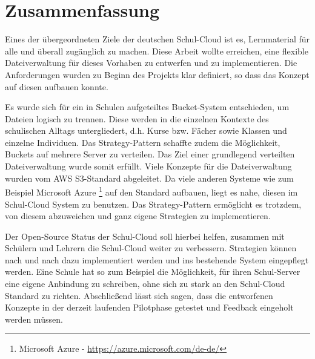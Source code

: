 \section{Zusammenfassung}
\label{sec:conclusion}

Eines der übergeordneten Ziele der deutschen Schul-Cloud ist es, Lernmaterial für alle und überall zugänglich zu machen. Diese Arbeit wollte erreichen, eine flexible Dateiverwaltung für dieses Vorhaben zu entwerfen und zu implementieren. Die Anforderungen wurden zu Beginn des Projekts klar definiert, so dass das Konzept auf diesen aufbauen konnte.

 Es wurde sich für ein in Schulen aufgeteiltes Bucket-System entschieden, um Dateien logisch zu trennen. Diese werden in die einzelnen Kontexte des schulischen Alltags untergliedert, d.h. Kurse bzw. Fächer sowie Klassen und einzelne Individuen. Das Strategy-Pattern schaffte zudem die Möglichkeit, Buckets auf mehrere Server zu verteilen. Das Ziel einer grundlegend verteilten Dateiverwaltung wurde somit erfüllt. Viele Konzepte für die Dateiverwaltung wurden vom AWS S3-Standard abgeleitet. Da viele anderen Systeme wie zum Beispiel Microsoft Azure \footnote{Microsoft Azure - \url{https://azure.microsoft.com/de-de/}} auf den Standard aufbauen, liegt es nahe, diesen im Schul-Cloud System zu benutzen. Das Strategy-Pattern ermöglicht es trotzdem, von diesem abzuweichen und ganz eigene Strategien zu implementieren.

Der Open-Source Status der Schul-Cloud soll hierbei helfen, zusammen mit Schülern und Lehrern die Schul-Cloud weiter zu verbessern. Strategien können nach und nach dazu implementiert werden und ins bestehende System eingepflegt werden. Eine Schule hat so zum Beispiel die Möglichkeit, für ihren Schul-Server eine eigene Anbindung zu schreiben, ohne sich zu stark an den Schul-Cloud Standard zu richten. Abschließend lässt sich sagen, dass die entworfenen Konzepte in der derzeit laufenden Pilotphase getestet und Feedback eingeholt werden müssen.

\clearpage

